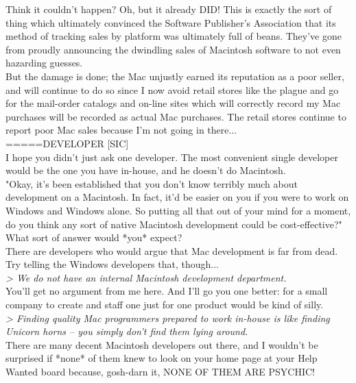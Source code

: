 \documentclass[11pt,twoside,a4paper]{article}
\begin{document}
\begin{multicols*}{2}
Think it couldn't happen? Oh, but it already DID! This is exactly the sort of thing which ultimately convinced the Software Publisher's Association that its method of tracking sales by platform was ultimately full of beans. They've gone from proudly announcing the dwindling sales of Macintosh software to not even hazarding guesses.~\\

But the damage is done; the Mac unjustly earned its reputation as a poor seller, and will continue to do so since I now avoid retail stores like the plague and go for the mail-order catalogs and on-line sites which will correctly record my Mac purchases will be recorded as actual Mac purchases. The retail stores continue to report poor Mac sales because I'm not going in there...~\\

=====DEVELOPER [SIC]~\\
I hope you didn't just ask one developer. The most convenient single developer would be the one you have in-house, and he doesn't do Macintosh.~\\

"Okay, it's been established that you don't know terribly much about development on a Macintosh. In fact, it'd be easier on you if you were to work on Windows and Windows alone. So putting all that out of your mind for a moment, do you think any sort of native Macintosh development could be cost-effective?"~\\

What sort of answer would *you* expect?~\\

There are developers who would argue that Mac development is far from dead. Try telling the Windows developers that, though...~\\

\emph{> We do not have an internal Macintosh development department.}~\\

You'll get no argument from me here. And I'll go you one better: for a small company to create and staff one just for one product would be kind of silly.~\\

\emph{> Finding quality Mac programmers prepared to work in-house is like finding Unicorn horns -- you simply don't find them lying around.}~\\

There are many decent Macintosh developers out there, and I wouldn't be surprised if *none* of them knew to look on your home page at your Help Wanted board because, gosh-darn it, NONE OF THEM ARE PSYCHIC!~\\


\end{multicols*}
\end{document}
